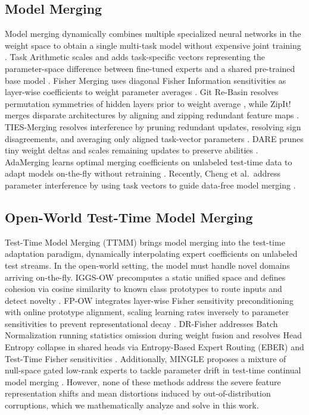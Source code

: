 \documentclass{article}
\theoremstyle{plain}
\theoremstyle{definition}
\theoremstyle{remark}
\begin{document}
\subsection{Model Merging}
Model merging dynamically combines multiple specialized neural networks in the weight space to obtain a single multi-task model without expensive joint training \cite{wortsman2022model}. Task Arithmetic scales and adds task-specific vectors representing the parameter-space difference between fine-tuned experts and a shared pre-trained base model \cite{ilharco2023editing}. Fisher Merging uses diagonal Fisher Information sensitivities as layer-wise coefficients to weight parameter averages \cite{matena2022merging}. Git Re-Basin resolves permutation symmetries of hidden layers prior to weight average \cite{ainsworth2023git}, while ZipIt! merges disparate architectures by aligning and zipping redundant feature maps \cite{stoica2024zipit}. TIES-Merging resolves interference by pruning redundant updates, resolving sign disagreements, and averaging only aligned task-vector parameters \cite{yadav2023ties}. DARE prunes tiny weight deltas and scales remaining updates to preserve abilities \cite{yu2024language}. AdaMerging learns optimal merging coefficients on unlabeled test-time data to adapt models on-the-fly without retraining \cite{yang2024adamerging}. Recently, Cheng et al.\ address parameter interference by using task vectors to guide data-free model merging \cite{cheng2025whoever}.

\subsection{Open-World Test-Time Model Merging}
Test-Time Model Merging (TTMM) brings model merging into the test-time adaptation paradigm, dynamically interpolating expert coefficients on unlabeled test streams. In the open-world setting, the model must handle novel domains arriving on-the-fly. IGGS-OW precomputes a static unified space and defines cohesion via cosine similarity to known class prototypes to route inputs and detect novelty \cite{iggs_ow}. FP-OW integrates layer-wise Fisher sensitivity preconditioning with online prototype alignment, scaling learning rates inversely to parameter sensitivities to prevent representational decay \cite{fp_ow}. DR-Fisher addresses Batch Normalization running statistics omission during weight fusion and resolves Head Entropy collapse in shared heads via Entropy-Based Expert Routing (EBER) and Test-Time Fisher sensitivities \cite{dr_fisher}. Additionally, MINGLE proposes a mixture of null-space gated low-rank experts to tackle parameter drift in test-time continual model merging \cite{qiu2025mingle}. However, none of these methods address the severe feature representation shifts and mean distortions induced by out-of-distribution corruptions, which we mathematically analyze and solve in this work.
\end{document}
